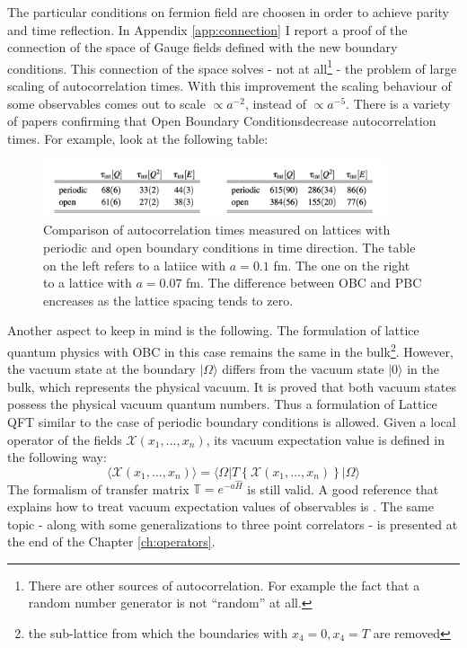 \documentclass[english, LaM, oneside, noexaminfo]{sapthesis}
\newcommand{\la}{\langle}
\newcommand{\ra}{\rangle}
\newcommand{\obc}{Open Boundary Conditions}
\begin{document}
The particular conditions on fermion field are choosen in order to achieve parity and time reflection.
In Appendix \ref{app:connection} I report a proof of the connection of the space of Gauge fields defined with the new boundary conditions.
This connection of the space solves - not at all\footnote{There are other sources of autocorrelation. For example the fact that a random number generator is not ``random'' at all.} - the problem of large scaling of autocorrelation times.
With this improvement the scaling behaviour of some observables comes out to scale $\propto a^{-2}$, instead of $\propto a^{-5}$.
There is a variety of papers confirming that \obc\space decrease autocorrelation times.
For example, look at the following table:
\begin{figure}[h!]
    \centering
    \includegraphics[width=0.9\textwidth]{imgs-MSc-thesis/autocorrelation.png}
    \caption{Comparison of autocorrelation times measured on lattices with periodic and open boundary conditions in time direction.
    The table on the left refers to a latiice with $a=0.1$ fm. The one on the right to a lattice with $a=0.07$ fm. The difference between OBC and PBC encreases as the lattice spacing tends to zero. \cite{Topology-WilsonFlow-HMC}}
    \label{tab:autocorrelation-times}
\end{figure}
\newline
Another aspect to keep in mind is the following.
The formulation of lattice quantum physics with OBC in this case remains the same in the bulk\footnote{the sub-lattice from which the boundaries with $x_4 = 0, x_4 = T$ are removed}.
However, the vacuum state at the boundary $|\Omega\ra$ differs from the vacuum state $|0\ra$ in the bulk, which represents the physical vacuum.
It is proved \cite{OBC_top} that both vacuum states possess the physical vacuum quantum numbers.
Thus a formulation of Lattice QFT similar to the case of periodic boundary conditions is allowed.
Given a local operator of the fields $\mathcal{X}(x_1,\dots,x_n)$, its vacuum expectation value is defined in the following way:
\begin{equation*}
    \la \mathcal{X}(x_1,\dots,x_n) \ra = \la \Omega | T \left\{ \mathcal{X}(x_1,\dots,x_n) \right\} | \Omega \ra
\end{equation*}
The formalism of transfer matrix $\mathbb{T} = e^{-a\hat H}$ is still valid.
A good reference that explains how to treat vacuum expectation values of observables is \cite{ExtractionSpectralQuantities}.
The same topic - along with some generalizations to three point correlators - is presented at the end of the Chapter \ref{ch:operators}.
\end{document}
